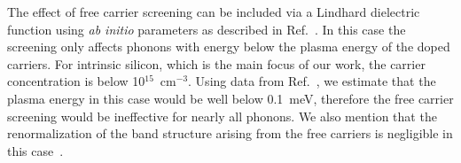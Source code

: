 \documentclass[aps,prl,twocolumn,superscriptaddress]{revtex4-1}
\begin{document}
The effect of free carrier screening can be included via a
Lindhard dielectric function using {\it ab initio} parameters as described in
Ref.~. 
In this case the screening only affects phonons with energy below the
plasma energy of the doped carriers. %
For intrinsic silicon, which is the main focus of our work, the carrier concentration is below 
10$^{15}$~cm$^{-3}$. Using data from Ref.~, we estimate 
that the plasma energy in this case would be well below 0.1~meV, therefore the free carrier screening 
would be ineffective for nearly all phonons. We also mention that the renormalization of the band structure
arising from the free carriers is negligible in this case~\cite{Caruso2016}.




\end{document}
